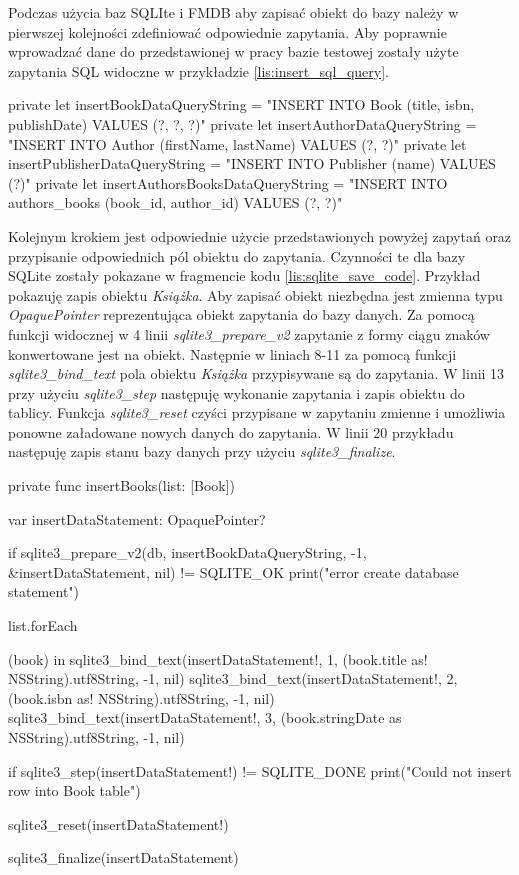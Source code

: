 Podczas użycia baz SQLIte i FMDB aby zapisać obiekt do bazy należy w pierwszej kolejności zdefiniować odpowiednie zapytania. Aby poprawnie wprowadzać dane do przedstawionej w pracy bazie testowej zostały użyte zapytania SQL widoczne w przykładzie \ref{lis:insert_sql_query}. 

\begin{code}[
		language=swift,
		caption={Zapytania SQL do wprowadzania danych},
		label={lis:insert_sql_query},
	]
    private let insertBookDataQueryString = "INSERT INTO Book (title, isbn, publishDate) VALUES (?, ?, ?)"
    private let insertAuthorDataQueryString = "INSERT INTO Author (firstName, lastName) VALUES (?, ?)"
    private let insertPublisherDataQueryString = "INSERT INTO Publisher (name) VALUES (?)"
    private let insertAuthorsBooksDataQueryString = "INSERT INTO authors_books (book_id, author_id) VALUES (?, ?)"
\end{code}

Kolejnym krokiem jest odpowiednie użycie przedstawionych powyżej zapytań oraz przypisanie odpowiednich pól obiektu do zapytania. Czynności te dla bazy SQLite zostały pokazane w fragmencie kodu \ref{lis:sqlite_save_code}. Przykład pokazuję zapis obiektu \textit{Książka}. Aby zapisać obiekt niezbędna jest zmienna typu \textit{OpaquePointer} reprezentująca obiekt zapytania do bazy danych. Za pomocą funkcji widocznej w 4 linii \textit{sqlite3\_prepare\_v2} zapytanie z formy ciągu znaków konwertowane jest na obiekt. Następnie w liniach 8-11 za pomocą funkcji \textit{sqlite3\_bind\_text} pola obiektu \textit{Książka} przypisywane są do zapytania. W linii 13 przy użyciu \textit{sqlite3\_step} następuję wykonanie zapytania i zapis obiektu do tablicy. Funkcja \textit{sqlite3\_reset} czyści przypisane w zapytaniu zmienne i umożliwia ponowne załadowane nowych danych do zapytania. W linii 20 przykładu następuję zapis stanu bazy danych przy użyciu \textit{sqlite3\_finalize}.

\begin{code}[
		language=swift,
		caption={Przykład zapisu obiektu SQLIte},
		label={lis:sqlite_save_code},
	]
    private func insertBooks(list: [Book]) {
        var insertDataStatement: OpaquePointer?
        
        if sqlite3_prepare_v2(db, insertBookDataQueryString, -1, &insertDataStatement, nil) != SQLITE_OK {
            print("error create database statement")
        }
        
        list.forEach { (book) in
            sqlite3_bind_text(insertDataStatement!, 1, (book.title as! NSString).utf8String, -1, nil)
            sqlite3_bind_text(insertDataStatement!, 2, (book.isbn as! NSString).utf8String, -1, nil)
            sqlite3_bind_text(insertDataStatement!, 3, (book.stringDate as NSString).utf8String, -1, nil)
            
            if sqlite3_step(insertDataStatement!) != SQLITE_DONE {
                print("Could not insert row into Book table")
            }
            
            sqlite3_reset(insertDataStatement!)
        }
        
        sqlite3_finalize(insertDataStatement)
    }
\end{code}

